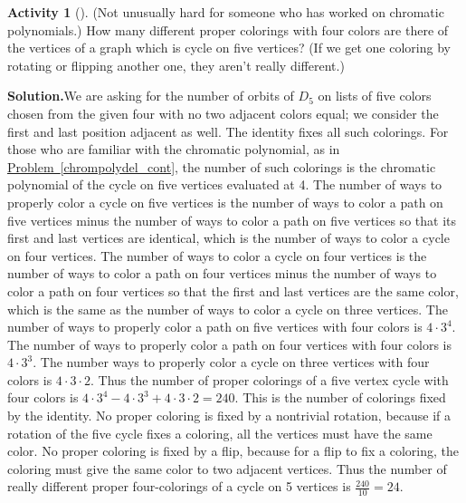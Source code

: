 \documentclass[10pt,]{book}
\theoremstyle{plain}
\theoremstyle{definition}
\newtheorem{activity}[project]{Activity}
\numberwithin{equation}{chapter}
\begin{document}
\begin{activity}[]\label{activity-316}
(Not unusually hard for someone who has worked on chromatic polynomials.) How many different proper colorings with four colors are there of the vertices of a graph which is cycle on five vertices? (If we get one coloring by rotating or flipping another one, they aren't really different.)%
\par\medskip\noindent%
\textbf{Solution.}\quad We are asking for the number of orbits of \(D_5\) on lists of five colors chosen from the given four with no two adjacent colors equal; we consider the first and last position adjacent as well. The identity fixes all such colorings. For those who are familiar with the chromatic polynomial, as in \hyperref[chrompolydel_cont]{Problem~\ref{chrompolydel_cont}}, the number of such colorings is the chromatic polynomial of the cycle on five vertices evaluated at 4. The number of ways to properly color a cycle on five vertices is the number of ways to color a path on five vertices minus the number of ways to color a path on five vertices so that its first and last vertices are identical, which is the number of ways to color a cycle on four vertices. The number of ways to color a cycle on four vertices is the number of ways to color a path on four vertices minus the number of ways to color a path on four vertices so that the first and last vertices are the same color, which is the same as the number of ways to color a cycle on three vertices. The number of ways to properly color a path on five vertices with four colors is \(4\cdot3^4\). The number of ways to properly color a path on four vertices with four colors is \(4\cdot3^3\). The number ways to properly color a cycle on three vertices with four colors is \(4\cdot3\cdot2\). Thus the number of proper colorings of a five vertex cycle with four colors is \(4\cdot3^4-4\cdot3^3
+4\cdot3\cdot2=240\). This is the number of colorings fixed by the identity. No proper coloring is fixed by a nontrivial rotation, because if a rotation of the five cycle fixes a coloring, all the vertices must have the same color. No proper coloring is fixed by a flip, because for a flip to fix a coloring, the coloring must give the same color to two adjacent vertices. Thus the number of really different proper four-colorings of a cycle on 5 vertices is \(\frac{240}{10}=24\).%
\end{activity}
\end{document}

